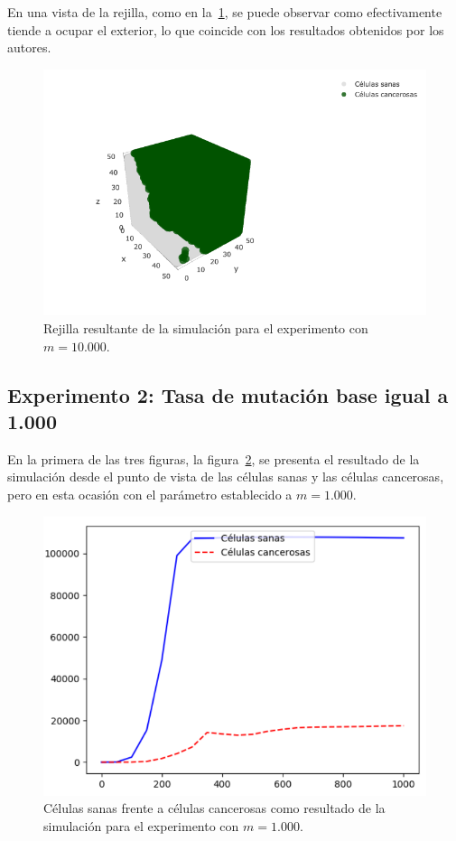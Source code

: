 En una vista de la rejilla, como en la~\ref{fig:ownexp1-3}, se puede observar como
efectivamente tiende a ocupar el exterior, lo que coincide con los resultados obtenidos por los
autores.

\begin{figure}[h]
\centering
\includegraphics[scale=0.6]{figures/experiments/exp1/grid}
\caption{Rejilla resultante de la simulación para el experimento con $m = 10.000$.}
\label{fig:ownexp1-3}
\end{figure}

\subsection{Experimento 2: Tasa de mutación base igual a 1.000}

En la primera de las tres figuras, la figura~\ref{fig:ownexp2-1}, se presenta el resultado
de la simulación desde el punto de vista de las células sanas y las células cancerosas,
pero en esta ocasión con el parámetro establecido a $m=1.000$.

\begin{figure}[h]
\centering
\includegraphics[scale=0.8]{figures/experiments/exp2/healthvscarcino}
\caption{Células sanas frente a células cancerosas como resultado de la simulación para el experimento con $m = 1.000$.}
\label{fig:ownexp2-1}
\end{figure}

